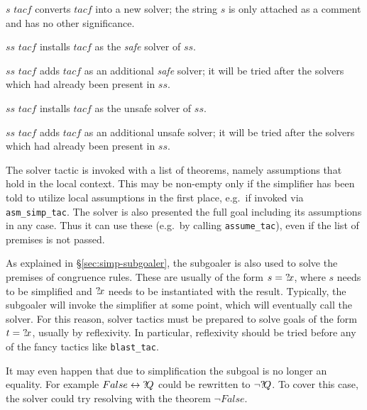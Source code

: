 \begin{ttdescription}
\item[\ttindexbold{mk_solver} $s$ $tacf$] converts $tacf$ into a new solver;
  the string $s$ is only attached as a comment and has no other significance.

\item[$ss$ \ttindexbold{setSSolver} $tacf$] installs $tacf$ as the
  \emph{safe} solver of $ss$.
  
\item[$ss$ \ttindexbold{addSSolver} $tacf$] adds $tacf$ as an
  additional \emph{safe} solver; it will be tried after the solvers
  which had already been present in $ss$.
  
\item[$ss$ \ttindexbold{setSolver} $tacf$] installs $tacf$ as the
  unsafe solver of $ss$.
  
\item[$ss$ \ttindexbold{addSolver} $tacf$] adds $tacf$ as an
  additional unsafe solver; it will be tried after the solvers which
  had already been present in $ss$.

\end{ttdescription}

\medskip

 The solver tactic is invoked
with a list of theorems, namely assumptions that hold in the local
context.  This may be non-empty only if the simplifier has been told
to utilize local assumptions in the first place, e.g.\ if invoked via
\texttt{asm_simp_tac}.  The solver is also presented the full goal
including its assumptions in any case.  Thus it can use these (e.g.\ 
by calling \texttt{assume_tac}), even if the list of premises is not
passed.

\medskip

As explained in {\S}\ref{sec:simp-subgoaler}, the subgoaler is also used
to solve the premises of congruence rules.  These are usually of the
form $s = {?\!x}$, where $s$ needs to be simplified and ${?\!x}$
needs to be instantiated with the result.  Typically, the subgoaler
will invoke the simplifier at some point, which will eventually call
the solver.  For this reason, solver tactics must be prepared to solve
goals of the form $t = {?\!x}$, usually by reflexivity.  In
particular, reflexivity should be tried before any of the fancy
tactics like \texttt{blast_tac}.

It may even happen that due to simplification the subgoal is no longer
an equality.  For example $False \leftrightarrow {?\!Q}$ could be rewritten to
$\neg{?\!Q}$.  To cover this case, the solver could try resolving
with the theorem $\neg False$.

